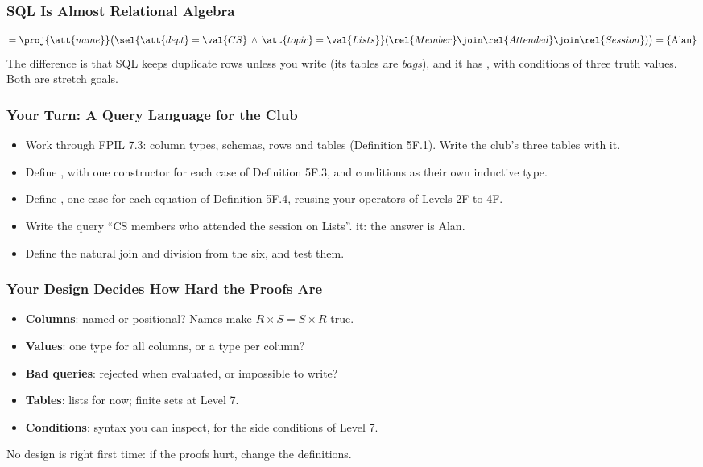 \documentclass{ltx-talk}
\begin{document}
\begin{frame*}
  \frametitle{SQL Is Almost Relational Algebra}
  \[
    = \proj{\att{name}}\bigl(\sel{\att{dept} = \val{CS} \,\wedge\,
      \att{topic} = \val{Lists}}(\rel{Member} \join \rel{Attended} \join
      \rel{Session})\bigr) = \{\text{Alan}\}
  \]
  The difference is that SQL keeps duplicate rows unless you write
   (its tables are \emph{bags}), and it has ,
  with conditions of three truth values. Both are stretch goals.
\end{frame*}

\begin{frame}
  \frametitle{Your Turn: A Query Language for the Club}
  \begin{itemize}
    \item {} Work through FPIL 7.3: column types, schemas, rows and
      tables (Definition 5F.1). Write the club's three tables with it.
    \item {} Define , with one constructor for each case
      of Definition 5F.3, and conditions as their own inductive type.
    \item {} Define , one case for each equation of
      Definition 5F.4, reusing your operators of Levels 2F to 4F.
    \item {} Write the query ``CS members who attended the session
      on Lists''.  it: the answer is Alan.
    \item {} Define the natural join and division from the six, and
      test them.
  \end{itemize}
\end{frame}

\begin{frame}
  \frametitle{Your Design Decides How Hard the Proofs Are}
  \begin{itemize}
    \item \textbf{Columns}: named or positional? Names make
      $R \times S = S \times R$ true.
    \item \textbf{Values}: one type for all columns, or a type per
      column?
    \item \textbf{Bad queries}: rejected when evaluated, or impossible to
      write?
    \item \textbf{Tables}: lists for now; finite sets at Level 7.
    \item \textbf{Conditions}: syntax you can inspect, for the side
      conditions of Level 7.
  \end{itemize}
  \begin{sticky}[halign = center]
    No design is right first time: if the proofs hurt, change the
    definitions.
  \end{sticky}
\end{frame}
\end{document}
